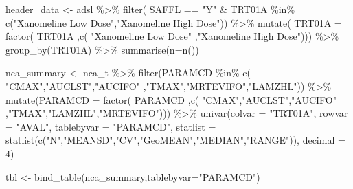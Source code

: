 \documentclass[
  letterpaper,
  DIV=11,
  numbers=noendperiod]{scrreprt}
\newenvironment{Shaded}{\begin{snugshade}}{\end{snugshade}}
\newcommand{\AttributeTok}[1]{\textcolor[rgb]{0.40,0.45,0.13}{#1}}
\newcommand{\DecValTok}[1]{\textcolor[rgb]{0.68,0.00,0.00}{#1}}
\newcommand{\FunctionTok}[1]{\textcolor[rgb]{0.28,0.35,0.67}{#1}}
\newcommand{\NormalTok}[1]{\textcolor[rgb]{0.00,0.23,0.31}{#1}}
\newcommand{\OtherTok}[1]{\textcolor[rgb]{0.00,0.23,0.31}{#1}}
\newcommand{\SpecialCharTok}[1]{\textcolor[rgb]{0.37,0.37,0.37}{#1}}
\newcommand{\StringTok}[1]{\textcolor[rgb]{0.13,0.47,0.30}{#1}}
\begin{document}
\begin{Shaded}
\begin{Highlighting}[]
\NormalTok{header\_data }\OtherTok{\textless{}{-}}\NormalTok{ adsl }\SpecialCharTok{\%\textgreater{}\%}
  \FunctionTok{filter}\NormalTok{(}
\NormalTok{    SAFFL }\SpecialCharTok{==} \StringTok{"Y"} \SpecialCharTok{\&} 
\NormalTok{    TRT01A }\SpecialCharTok{\%in\%} \FunctionTok{c}\NormalTok{(}\StringTok{"Xanomeline Low Dose"}\NormalTok{,}\StringTok{"Xanomeline High Dose"}\NormalTok{)) }\SpecialCharTok{\%\textgreater{}\%}
  \FunctionTok{mutate}\NormalTok{(}
    \AttributeTok{TRT01A =} \FunctionTok{factor}\NormalTok{( TRT01A}
\NormalTok{                    ,}\FunctionTok{c}\NormalTok{( }\StringTok{"Xanomeline Low Dose"}
\NormalTok{                       ,}\StringTok{"Xanomeline High Dose"}\NormalTok{))) }\SpecialCharTok{\%\textgreater{}\%}
  \FunctionTok{group\_by}\NormalTok{(TRT01A) }\SpecialCharTok{\%\textgreater{}\%}
  \FunctionTok{summarise}\NormalTok{(}\AttributeTok{n=}\FunctionTok{n}\NormalTok{()) }

\NormalTok{nca\_summary }\OtherTok{\textless{}{-}}\NormalTok{ nca\_t }\SpecialCharTok{\%\textgreater{}\%}
  \FunctionTok{filter}\NormalTok{(PARAMCD }\SpecialCharTok{\%in\%} \FunctionTok{c}\NormalTok{( }\StringTok{"CMAX"}\NormalTok{,}\StringTok{"AUCLST"}\NormalTok{,}\StringTok{"AUCIFO"}
\NormalTok{                        ,}\StringTok{"TMAX"}\NormalTok{,}\StringTok{"MRTEVIFO"}\NormalTok{,}\StringTok{"LAMZHL"}\NormalTok{)) }\SpecialCharTok{\%\textgreater{}\%}
  \FunctionTok{mutate}\NormalTok{(}\AttributeTok{PARAMCD =} \FunctionTok{factor}\NormalTok{( PARAMCD}
\NormalTok{                          ,}\FunctionTok{c}\NormalTok{( }\StringTok{"CMAX"}\NormalTok{,}\StringTok{"AUCLST"}\NormalTok{,}\StringTok{"AUCIFO"}
\NormalTok{                             ,}\StringTok{"TMAX"}\NormalTok{,}\StringTok{"LAMZHL"}\NormalTok{,}\StringTok{"MRTEVIFO"}\NormalTok{))) }\SpecialCharTok{\%\textgreater{}\%}
  \FunctionTok{univar}\NormalTok{(}\AttributeTok{colvar =} \StringTok{"TRT01A"}\NormalTok{, }
         \AttributeTok{rowvar =} \StringTok{"AVAL"}\NormalTok{, }
         \AttributeTok{tablebyvar =} \StringTok{"PARAMCD"}\NormalTok{,}
         \AttributeTok{statlist =} \FunctionTok{statlist}\NormalTok{(}\FunctionTok{c}\NormalTok{(}\StringTok{"N"}\NormalTok{,}\StringTok{"MEANSD"}\NormalTok{,}\StringTok{"CV"}\NormalTok{,}\StringTok{"GeoMEAN"}\NormalTok{,}\StringTok{"MEDIAN"}\NormalTok{,}\StringTok{"RANGE"}\NormalTok{)),}
         \AttributeTok{decimal =} \DecValTok{4}\NormalTok{)}

\NormalTok{tbl }\OtherTok{\textless{}{-}} \FunctionTok{bind\_table}\NormalTok{(nca\_summary,}\AttributeTok{tablebyvar=}\StringTok{"PARAMCD"}\NormalTok{)}


\end{Highlighting}
\end{Shaded}
\end{document}

